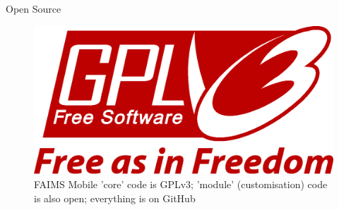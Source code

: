 \documentclass[aspectratio=169, 12pt]{beamer} %
\begin{document}
\begin{frame}{Open Source}
 \begin{figure}[H]
    \centering
        \includegraphics[width=.75\textwidth]{figures/GPLv3_Logo.eps}
        \caption{FAIMS Mobile 'core' code is GPLv3; 'module' (customisation) code is also open; everything is on GitHub}
        \label{fig:FAIMS-github-OSS}
 \end{figure}
\end{frame}
\end{document}
